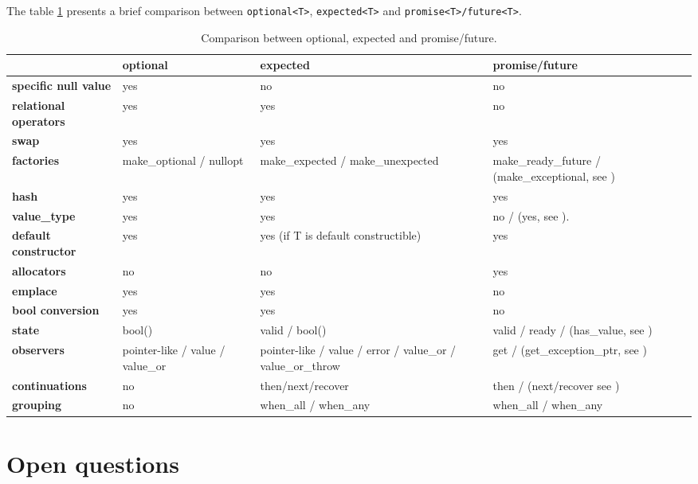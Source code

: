 \documentclass[a4paper,10pt]{article}
\newcommand{\cpp}[1]{\lstinline{#1}}
\begin{document}
The table \ref{comp-monads} presents a brief comparison between \cpp{optional<T>}, \cpp{expected<T>}  and \cpp{promise<T>/future<T>}.

\begin{table}
\bgroup
\def\arraystretch{1.5}
\begin{tabular}{|l|>{\raggedright\arraybackslash}p{4cm}|>{\raggedright\arraybackslash}p{4cm}|>{\raggedright\arraybackslash}p{4cm}|}
\hline
                    & \textbf{optional} & \textbf{expected} & \textbf{promise/future} \\
\hline
\textbf{specific null value} & yes & no & no \\
\hline
\textbf{relational operators} & yes & yes & no \\
\hline
\textbf{swap} & yes & yes & yes \\
\hline
\textbf{factories} & make_optional / nullopt & make_expected / make_unexpected & make_ready_future / (make_exceptional, see \cite{MoreAsync}) \\
\hline
\textbf{hash} & yes & yes & yes \\
\hline
\textbf{value_type} & yes & yes & no / (yes, see \cite{MoreAsync}).  \\
\hline
\textbf{default constructor} & yes & yes (if T is default constructible) & yes \\
\hline
\textbf{allocators} & no & no & yes \\
\hline
\textbf{emplace} & yes & yes & no \\
\hline
\textbf{bool conversion} & yes & yes & no \\
\hline
\textbf{state} & bool()  & valid / bool() & valid / ready / (has_value, see \cite{MoreAsync}) \\
\hline
\textbf{observers} & pointer-like / value / value_or & pointer-like / value / error / value_or / value_or_throw & get / (get_exception_ptr, see \cite{MoreAsync}) \\
\hline
\textbf{continuations} & no & then/next/recover  & then / (next/recover see \cite{MoreAsync}) \\
\hline
\textbf{grouping} & no & when_all / when_any & when_all / when_any \\
\hline
\end{tabular}
\egroup
\caption{Comparison between optional, expected and promise/future.}
\label{comp-monads}
\end{table}



\section{Open questions}
\end{document}
